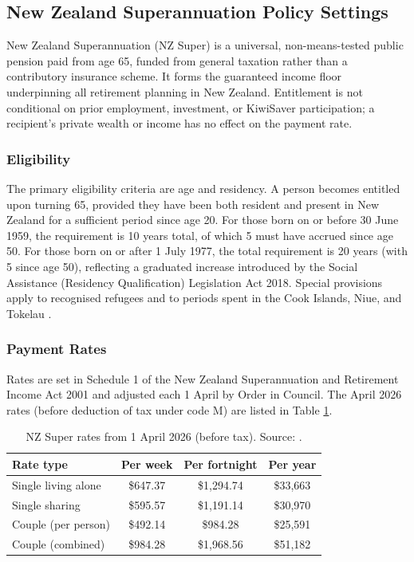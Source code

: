 \documentclass[11pt]{article}
\begin{document}
\subsection{New Zealand Superannuation Policy Settings}

New Zealand Superannuation (NZ Super) is a universal, non-means-tested public pension paid from age 65, funded from general taxation rather than a contributory insurance scheme. It forms the guaranteed income floor underpinning all retirement planning in New Zealand. Entitlement is not conditional on prior employment, investment, or KiwiSaver participation; a recipient's private wealth or income has no effect on the payment rate.

\subsubsection*{Eligibility}

The primary eligibility criteria are age and residency. A person becomes entitled upon turning 65, provided they have been both resident and present in New Zealand for a sufficient period since age 20. For those born on or before 30 June 1959, the requirement is 10 years total, of which 5 must have accrued since age 50. For those born on or after 1 July 1977, the total requirement is 20 years (with 5 since age 50), reflecting a graduated increase introduced by the Social Assistance (Residency Qualification) Legislation Act 2018. Special provisions apply to recognised refugees and to periods spent in the Cook Islands, Niue, and Tokelau \parencite[s.~8]{nzsuperAct2001}.

\subsubsection*{Payment Rates}

Rates are set in Schedule 1 of the New Zealand Superannuation and Retirement Income Act 2001 and adjusted each 1 April by Order in Council. The April 2026 rates (before deduction of tax under code M) are listed in Table \ref{tab:nzSuperRates}. 

\begin{table}[htbp]
  \centering
  \caption{NZ Super rates from 1 April 2026 (before tax). Source: \textcite{winz2026benefitRates, winz2026SuperRates}.}
  \label{tab:nzSuperRates}
  \begin{tabular}{lccc}
    \toprule
    Rate type & Per week & Per fortnight & Per year \\
    \midrule
    Single living alone   & \$647.37 & \$1{,}294.74 & \$33{,}663 \\
    Single sharing        & \$595.57 & \$1{,}191.14 & \$30{,}970 \\
    Couple (per person)   & \$492.14 & \$984.28  & \$25{,}591 \\
    Couple (combined)     & \$984.28 & \$1{,}968.56 & \$51{,}182 \\
    \bottomrule
  \end{tabular}
\end{table}
\end{document}
